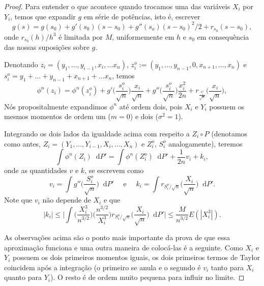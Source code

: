 \documentclass[reqno, draft]{book}
\newcommand*\1{\mathds{1}}
\renewcommand*\d{\mathop{}\!\mathrm{d}}
\begin{document}
\begin{proof}
  Para entender o que acontece quando trocamos uma das variáveis $X_i$ por $Y_i$, temos que expandir $g$ em série de potências, isto é, escrever
  \begin{equation}
    g(s) = g(s_0) + g'(s_0)(s - s_0) + g''(s_o)(s-s_0)^2/2 + r_{s_0}(s - s_0),
  \end{equation}
  onde $r_{s_0}(h)/h^3$ é limitada por $M$, uniformemente em $h$ e $s_0$ em consequência das nossas suposições sobre $g$.

  Denotando $z_i = (y_1, \dots, y_{i-1}, x_i, \dots x_n)$, $z_i^o := (y_1, \dots, y_{n-1}, 0, x_{n+1}, \dots, x_n)$ e $s_i^o = y_1 + \dots + y_{n-1} + x_{n+1} + \dots x_n$, temos
  \begin{equation}
    \phi^n(z_i) %
    = \phi^n(z_i^o) + g' \Big( \frac{s_i^o}{\sqrt{n}} \Big) \frac{x_i}{\sqrt{n}} + g'' \Big( \frac{s_i^o}{\sqrt{n}} \Big) \frac{x_i^2}{2n} + r_{\frac{s_i^o}{\sqrt{n}}} \Big( \frac{x_i}{\sqrt{n}} \Big),
  \end{equation}
  Nós propositalmente expandimos $\phi^n$ até ordem dois, pois $X_i$ e $Y_i$ possuem os mesmos momentos de ordem um ($m=0$) e dois ($\sigma^2=1$).

  Integrando os dois lados da igualdade acima com respeito a $Z_i \circ P$ (denotamos como antes, $Z_i = (Y_1, \dots, Y_{i-1}, X_i, \dots, X_n)$ e $Z_i^o$, $S_i^o$ analogamente), teremos
  \begin{equation}
    \int \phi^n(Z_i) \d P' = \int \phi^n(Z_i^o) \d P' + \frac{1}{2n} v_i + k_i,
  \end{equation}
  onde as quantidades $v$ e $k$, se escrevem como
  \begin{equation}
    v_i = \int g'' \Big( \frac{S_i^o}{\sqrt{n}} \Big) \d P' \quad \text{ e } \quad k_i = \int r_{S_i^o/\sqrt{n}} \Big(\frac{X_i}{\sqrt{n}}\Big) \d P'.
  \end{equation}
  Note que $v_i$ não depende de $X_i$ e que
  \begin{equation}
    |k_i| \leq \Big| \int \Big(\frac{X_i^3}{n^{3/2}}\Big) \Big(\frac{n^{3/2}}{X_i^3}\Big) r_{S_i^o/\sqrt{n}} \Big(\frac{X_i}{\sqrt{n}}\Big) \d P' \Big| \leq \frac{M}{n^{3/2}} E(|X_i^3|).
  \end{equation}

  As observações acima são o ponto mais importante da prova de que essa aproximação funciona e uma outra maneira de colocá-las é a seguinte.
  Como $X_i$ e $Y_i$ possuem os dois primeiros momentos iguais, os dois primeiros termos de Taylor coincidem após a integração (o primeiro se anula e o segundo é $v_i$ tanto para $X_i$ quanto para $Y_i$).
  O resto é de ordem muito pequena para influir no limite.


\end{proof}
\end{document}
